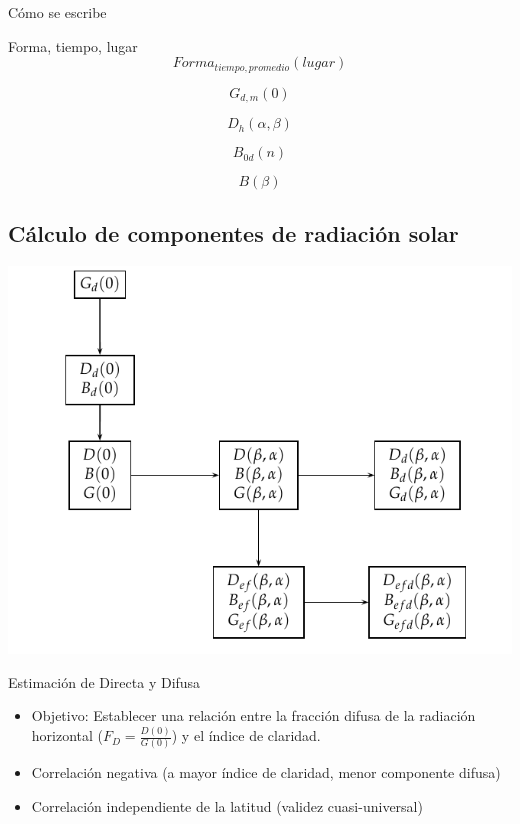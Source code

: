 \documentclass[xcolor={usenames,svgnames,dvipsnames}]{beamer}
\begin{document}
\begin{frame}[label={sec:org070f7ef}]{Cómo se escribe}
\begin{block}{Forma, tiempo, lugar}
\[Forma_{tiempo,promedio}(lugar)\]

\[G_{d,m}(0)\]

\[D_{h}(\alpha,\beta)\]

\[B_{0d}(n)\]

\[B(\beta)\]
\end{block}
\end{frame}
\subsection{Cálculo de componentes de radiación solar}
\label{sec:org6f39b15}

\begin{frame}[label={sec:org1b97852}]{}
\begin{center}
\includegraphics[width=.9\linewidth]{../figs/ProcedimientoCalculoRadiacionInclinada.pdf}
\end{center}
\end{frame}

\begin{frame}[label={sec:org409fd9d}]{Estimación de Directa y Difusa}
\begin{itemize}
\item Objetivo: Establecer una \alert{relación entre la fracción difusa} de la radiación horizontal (\(F_{D}=\frac{D(0)}{G(0)}\)) y \alert{el índice de claridad}.

\item \alert{Correlación negativa} (a mayor índice de claridad, menor componente difusa)

\item \alert{Correlación independiente de la latitud} (validez cuasi-universal)
\end{itemize}
\end{frame}
\end{document}
